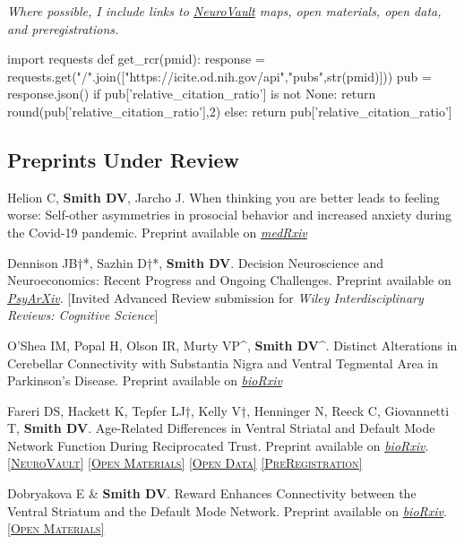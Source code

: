 \documentclass[11pt, letterpaper]{article}
\newcommand{\psyarxiv}[1]{\href{#1}{\textit{PsyArXiv}}}
\newcommand{\biorxiv}[1]{\href{#1}{\textit{bioRxiv}}}
\newcommand{\medrxiv}[1]{\href{#1}{\textit{medRxiv}}}
\newcommand{\neurovault}[1]{\href{#1}{\scriptsize\textsc{[NeuroVault]}}}
\newcommand{\materials}[1]{\href{#1}{\scriptsize\textsc{[Open Materials]}}}
\newcommand{\data}[1]{\href{#1}{\scriptsize\textsc{[Open Data]}}}
\newcommand{\preregistration}[1]{\href{#1}{\scriptsize\textsc{[PreRegistration]}}}
\begin{document}
\textit{Where possible, I include links to \href{https://neurovault.org}{NeuroVault} maps, open materials, open data, and preregistrations.}


\begin{pycode}
import requests
def get_rcr(pmid):
  response = requests.get("/".join(["https://icite.od.nih.gov/api","pubs",str(pmid)]))
  pub = response.json()
  if pub['relative_citation_ratio'] is not None:
    return round(pub['relative_citation_ratio'],2)
  else:
    return pub['relative_citation_ratio']
\end{pycode}


\subsection*{Preprints Under Review}

\begin{hangparas}{.5in}{1}

Helion C, \textbf{Smith DV}, Jarcho J. When thinking you are better leads to feeling worse: Self-other asymmetries in prosocial behavior and increased anxiety during the Covid-19 pandemic. Preprint available on \medrxiv{https://doi.org/10.1101/2021.02.26.21252547}

Dennison JB†*, Sazhin D†*, \textbf{Smith DV}. Decision Neuroscience and Neuroeconomics: Recent Progress and Ongoing Challenges. Preprint available on \psyarxiv{https://doi.org/10.31234/osf.io/4v2re}. [Invited Advanced Review submission for \textit{Wiley Interdisciplinary Reviews: Cognitive Science}] 

O'Shea IM, Popal H, Olson IR, Murty VP\^{}, \textbf{Smith DV}\^{}. Distinct Alterations in Cerebellar Connectivity with Substantia Nigra and Ventral Tegmental Area in Parkinson's Disease. Preprint available on \biorxiv{https://doi.org/10.1101/2021.05.13.443998}

Fareri DS, Hackett K, Tepfer LJ†, Kelly V†, Henninger N, Reeck C, Giovannetti T, \textbf{Smith DV}. Age-Related Differences in Ventral Striatal and Default Mode Network Function During Reciprocated Trust. Preprint available on \biorxiv{https://www.biorxiv.org/content/10.1101/2021.07.28.454071v1}. \neurovault{https://identifiers.org/neurovault.collection:10447} \materials{https://github.com/DVS-Lab/srndna-trustgame} \data{https://openneuro.org/datasets/ds003745} \preregistration{https://aspredicted.org/MVZ_ODI}

Dobryakova E \& \textbf{Smith DV}. Reward Enhances Connectivity between the Ventral Striatum and the Default Mode Network. Preprint available on \biorxiv{https://doi.org/10.1101/2021.07.28.454086}. \materials{https://github.com/edobryakova/DobryakovaSmith_HCP} \\


\end{hangparas}
\end{document}
